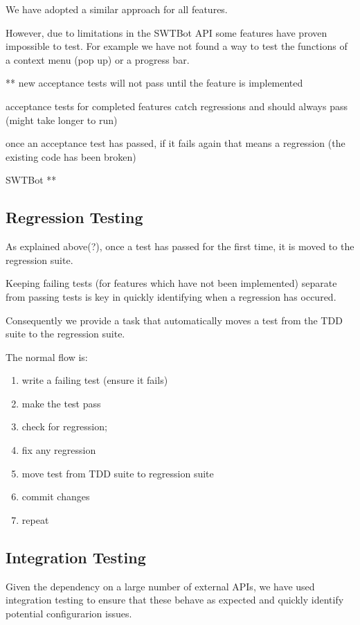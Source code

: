 \documentclass[10pt]{article}
\begin{document}
We have adopted a similar approach for all features.

However, due to limitations in the SWTBot API some features have proven impossible to test. For example we have not found a way to test the functions of a context menu (pop up) or a progress bar.

** new acceptance tests will not pass until the feature is implemented

acceptance tests for completed features catch regressions and should always pass (might take
longer to run)

once an acceptance test has passed, if it fails again that means a regression (the existing code has been broken)

SWTBot **

\subsection{Regression Testing}
As explained above(?), once a test has passed for the first time, it is moved to the regression suite.

Keeping failing tests (for features which have not been implemented) separate from passing tests is key in quickly identifying when a regression has occured.

Consequently we provide a task that automatically moves a test from the TDD suite to the regression suite.

The normal flow is: 
\begin{enumerate}
\item write a failing test (ensure it fails)
\item make the test pass
\item check for regression;
\item fix any regression
\item move test from TDD suite to regression suite
\item commit changes
\item repeat
\end{enumerate}

\subsection{Integration Testing}

Given the dependency on a large number of external APIs, we have used integration testing to ensure that these behave as expected and quickly identify potential configurarion issues. 
\end{document}
